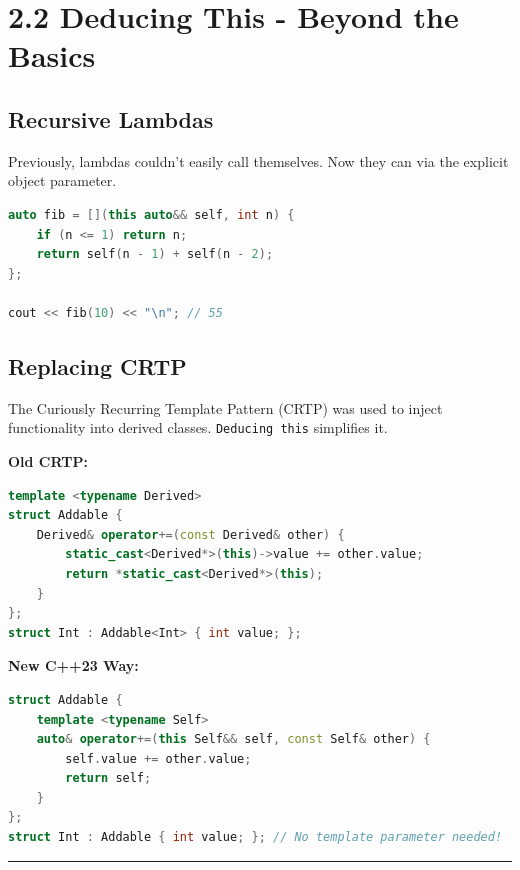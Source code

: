 \hypertarget{deducing-this---beyond-the-basics}{%
\section{2.2 Deducing This - Beyond the
Basics}\label{deducing-this---beyond-the-basics}}

\hypertarget{recursive-lambdas}{%
\subsection{Recursive Lambdas}\label{recursive-lambdas}}

Previously, lambdas couldn't easily call themselves. Now they can via
the explicit object parameter.

\begin{lstlisting}[language={C++}]
auto fib = [](this auto&& self, int n) {
    if (n <= 1) return n;
    return self(n - 1) + self(n - 2);
};

cout << fib(10) << "\n"; // 55
\end{lstlisting}

\hypertarget{replacing-crtp}{%
\subsection{Replacing CRTP}\label{replacing-crtp}}

The Curiously Recurring Template Pattern (CRTP) was used to inject
functionality into derived classes.
\passthrough{\lstinline!Deducing this!} simplifies it.

\textbf{Old CRTP:}

\begin{lstlisting}[language={C++}]
template <typename Derived>
struct Addable {
    Derived& operator+=(const Derived& other) {
        static_cast<Derived*>(this)->value += other.value;
        return *static_cast<Derived*>(this);
    }
};
struct Int : Addable<Int> { int value; };
\end{lstlisting}

\textbf{New C++23 Way:}

\begin{lstlisting}[language={C++}]
struct Addable {
    template <typename Self>
    auto& operator+=(this Self&& self, const Self& other) {
        self.value += other.value;
        return self;
    }
};
struct Int : Addable { int value; }; // No template parameter needed!
\end{lstlisting}

\begin{center}\rule{0.5\linewidth}{0.5pt}\end{center}


